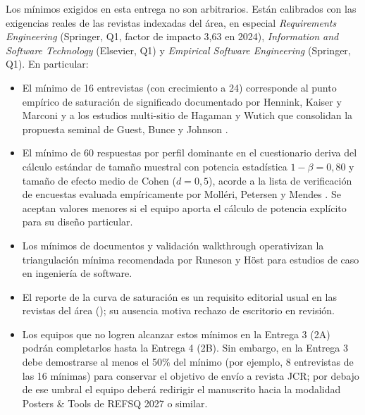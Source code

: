 \documentclass[11pt,a4paper]{article}
\begin{document}
\begin{notabox}[title=Justificación empírica de los mínimos ---  alineación con las revistas JCR de Ingeniería de Requerimientos]
Los mínimos exigidos en esta entrega no son arbitrarios. Están calibrados con las exigencias reales de las revistas indexadas del área, en especial \textit{Requirements Engineering} (Springer, Q1, factor de impacto 3,63 en 2024), \textit{Information and Software Technology} (Elsevier, Q1) y \textit{Empirical Software Engineering} (Springer, Q1). En particular:
\begin{itemize}
    \item El mínimo de 16 entrevistas (con crecimiento a 24) corresponde al punto empírico de saturación de significado documentado por Hennink, Kaiser y Marconi \cite{hennink2017saturation} y a los estudios multi-sitio de Hagaman y Wutich \cite{hagaman2017metathemes} que consolidan la propuesta seminal de Guest, Bunce y Johnson \cite{guest2006interviews}.
    \item El mínimo de 60 respuestas por perfil dominante en el cuestionario deriva del cálculo estándar de tamaño muestral con potencia estadística $1-\beta = 0{,}80$ y tamaño de efecto medio de Cohen ($d = 0{,}5$), acorde a la lista de verificación de encuestas evaluada empíricamente por Molléri, Petersen y Mendes \cite{molleri2020checklist}. Se aceptan valores menores si el equipo aporta el cálculo de potencia explícito para su diseño particular.
    \item Los mínimos de documentos y validación walkthrough operativizan la triangulación mínima recomendada por Runeson y Höst \cite{runeson2009guidelines} para estudios de caso en ingeniería de software.
    \item El reporte de la curva de saturación es un requisito editorial usual en las revistas del área (\cite{hennink2017saturation,mendez2017naming}); su ausencia motiva rechazo de escritorio en revisión.
    \item Los equipos que no logren alcanzar estos mínimos en la Entrega 3 (2A) podrán completarlos hasta la Entrega 4 (2B). Sin embargo, en la Entrega 3 debe demostrarse al menos el 50\% del mínimo (por ejemplo, 8 entrevistas de las 16 mínimas) para conservar el objetivo de envío a revista JCR; por debajo de ese umbral el equipo deberá redirigir el manuscrito hacia la modalidad Posters \& Tools de REFSQ 2027 o similar.
\end{itemize}
\end{notabox}
\end{document}
